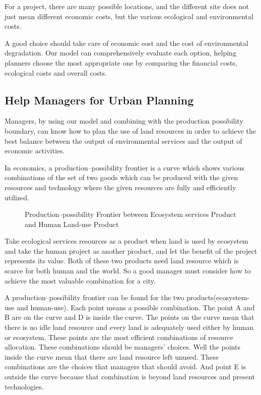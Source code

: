 \documentclass{mcmthesis}
\begin{document}
			For a project, there are many possible locations, and the different site does not just mean different economic costs, but the various ecological and environmental costs.
			
			A good choice should take care of economic cost and the cost of environmental degradation. Our model can comprehensively evaluate each option, helping planners choose the most appropriate one by comparing the financial costs, ecological costs and overall costs.
		
		\subsection{Help Managers for Urban Planning}
		
			Managers, by using our model and combining with the production possibility boundary,  can know how to plan the use of land resources in order to achieve the best balance between the output of environmental services and the output of economic activities.
			
			In economics, a production–possibility frontier is a curve which shows various combinations of the set of two goods which can be produced with the given resources and technology where the given resources are fully and efficiently utilized.
			
			\begin{figure}[htbp]
				\centering
				\centering
				\caption{Production–possibility Frontier between Ecosystem services Product and Human Land-use Product}
			\end{figure}
			
			Take ecological services resources as a product when land is used by ecosystem and take the human project as another product, and let the benefit of the project represents its value. Both of these two products need land resource which is scarce for both human and the world. So a good manager must consider how to achieve the most valuable combination for a city.
			
			A production–possibility frontier can be found for the two products(ecosystem-use and human-use). Each point means a possible combination. The point A and B are on the curve and D is inside the curve. The points on the curve mean that there is no idle land resource and every land is adequately used either by human or ecosystem. These points are the most efficient combinations of resource allocation. These combinations should be managers’ choices. Well the points inside the curve mean that there are land resource left unused. These combinations are the choices that managers that should avoid. And point E is outside the curve because that combination is beyond land resources and present technologies. 
			
\end{document}
